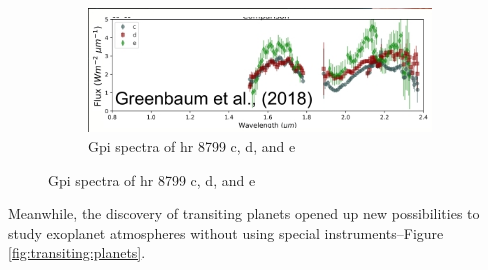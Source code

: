 \documentclass[]{article}
\begin{document}
\begin{figure}[H]
\begin{subfigure}[b]{0.3\textwidth}
	\end{subfigure}
	\;\;\;
	\begin{subfigure}[b]{0.35\textwidth}
		\caption{Gpi spectra of hr 8799 c, d,
			and e\cite{greenbaum2018gpi}}\label{fig:young:jupiter2}
		\includegraphics[width=\textwidth]{DirectImaging2.jpg}
	\end{subfigure}
\end{figure}

Meanwhile, the discovery
of transiting planets
opened up new possibilities
to study exoplanet atmospheres
without using special instruments--Figure \ref{fig:transiting:planets}.
\end{document}
